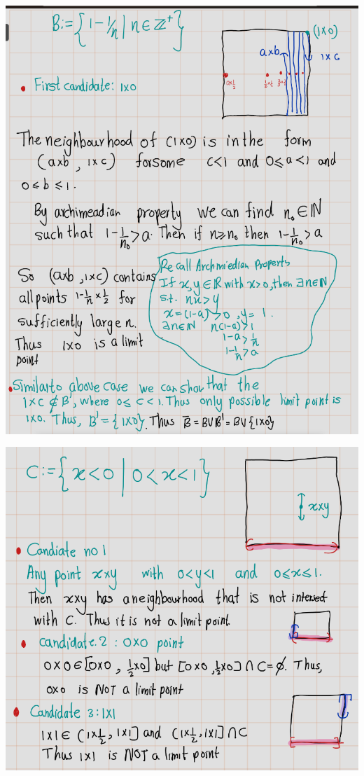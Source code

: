 \documentclass[
]{book}
\theoremstyle{definition}
\theoremstyle{definition}
\theoremstyle{definition}
\theoremstyle{definition}
\theoremstyle{remark}
\begin{document}
\includegraphics{figures/Exercises/Ex 2.17/ex-18-3.png}

\includegraphics{figures/Exercises/Ex 2.17/ex-18-4.png}
\end{document}
